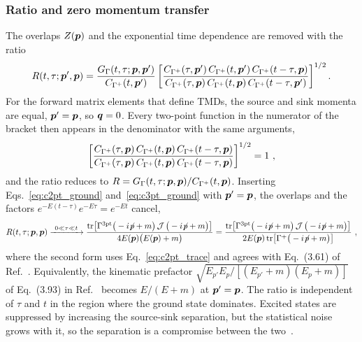 \subsubsection{Ratio and zero momentum transfer}
The overlaps $Z(\boldsymbol{p})$ and the exponential time dependence are removed with the ratio~\cite{Lin:2014}
\begin{equation}
    R(t,\tau;\boldsymbol{p}',\boldsymbol{p})=\frac{G_\Gamma(t,\tau;\boldsymbol{p},\boldsymbol{p}')}{C_{\Gamma^+}(t,\boldsymbol{p}')}\left[\frac{C_{\Gamma^+}(\tau,\boldsymbol{p}')\,C_{\Gamma^+}(t,\boldsymbol{p}')\,C_{\Gamma^+}(t-\tau,\boldsymbol{p})}{C_{\Gamma^+}(\tau,\boldsymbol{p})\,C_{\Gamma^+}(t,\boldsymbol{p})\,C_{\Gamma^+}(t-\tau,\boldsymbol{p}')}\right]^{1/2} .
    \label{eq:ratio_general}
\end{equation}
For the forward matrix elements that define TMDs, the source and sink momenta are equal, $\boldsymbol{p}'=\boldsymbol{p}$, so $\boldsymbol{q}=0$. Every two-point function in the numerator of the bracket then appears in the denominator with the same arguments,
\begin{equation}
    \left[\frac{C_{\Gamma^+}(\tau,\boldsymbol{p})\,C_{\Gamma^+}(t,\boldsymbol{p})\,C_{\Gamma^+}(t-\tau,\boldsymbol{p})}{C_{\Gamma^+}(\tau,\boldsymbol{p})\,C_{\Gamma^+}(t,\boldsymbol{p})\,C_{\Gamma^+}(t-\tau,\boldsymbol{p})}\right]^{1/2}=1 \ ,
    \label{eq:sqrt_unity}
\end{equation}
and the ratio reduces to $R=G_\Gamma(t,\tau;\boldsymbol{p},\boldsymbol{p})/C_{\Gamma^+}(t,\boldsymbol{p})$. Inserting Eqs.~\eqref{eq:c2pt_ground} and~\eqref{eq:c3pt_ground} with $\boldsymbol{p}'=\boldsymbol{p}$, the overlaps and the factors $e^{-E(t-\tau)}e^{-E\tau}=e^{-Et}$ cancel,
\begingroup\small
\begin{equation}
    R(t,\tau;\boldsymbol{p},\boldsymbol{p})\xrightarrow{\ 0\ll\tau\ll t\ }\frac{\mathrm{tr}\big[\Gamma^{\rm 3pt}\big(-i{\not\!p}+m\big)\,\mathcal J\,\big(-i{\not\!p}+m\big)\big]}{4E(\boldsymbol{p})\big(E(\boldsymbol{p})+m\big)}
    =\frac{\mathrm{tr}\big[\Gamma^{\rm 3pt}\big(-i{\not\!p}+m\big)\,\mathcal J\,\big(-i{\not\!p}+m\big)\big]}{2E(\boldsymbol{p})\,\mathrm{tr}\big[\Gamma^+\big(-i{\not\!p}+m\big)\big]} \ ,
    \label{eq:ratio_forward}
\end{equation}
\endgroup
where the second form uses Eq.~\eqref{eq:c2pt_trace} and agrees with Eq.~(3.61) of Ref.~\cite{MuschThesis2}. Equivalently, the kinematic prefactor $\sqrt{E_{p'}E_p/[(E_{p'}+m)(E_p+m)]}$ of Eq.~(3.93) in Ref.~\cite{Lin:2014} becomes $E/(E+m)$ at $\boldsymbol{p}'=\boldsymbol{p}$. The ratio is independent of $\tau$ and $t$ in the region where the ground state dominates. Excited states are suppressed by increasing the source-sink separation, but the statistical noise grows with it, so the separation is a compromise between the two~\cite{MuschThesis2}.

